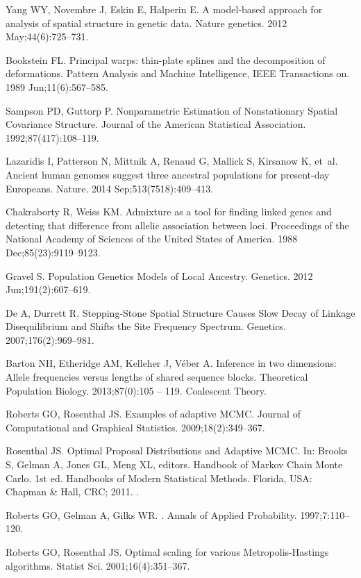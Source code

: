 \documentclass[10pt,letterpaper]{article}
\begin{document}
\begin{thebibliography}{80}
Yang WY, Novembre J, Eskin E, Halperin E.
\newblock A model-based approach for analysis of spatial structure in genetic
  data.
\newblock Nature genetics. 2012 May;44(6):725--731.

Bookstein FL.
\newblock Principal warps: thin-plate splines and the decomposition of
  deformations.
\newblock Pattern Analysis and Machine Intelligence, IEEE Transactions on. 1989
  Jun;11(6):567--585.

Sampson PD, Guttorp P.
\newblock Nonparametric Estimation of Nonstationary Spatial Covariance
  Structure.
\newblock Journal of the American Statistical Association.
  1992;87(417):108--119.

Lazaridis I, Patterson N, Mittnik A, Renaud G, Mallick S, Kirsanow K, et~al.
\newblock Ancient human genomes suggest three ancestral populations for
  present-day {Europeans}.
\newblock Nature. 2014 Sep;513(7518):409--413.

Chakraborty R, Weiss KM.
\newblock Admixture as a tool for finding linked genes and detecting that
  difference from allelic association between loci.
\newblock Proceedings of the National Academy of Sciences of the United States
  of America. 1988 Dec;85(23):9119--9123.

Gravel S.
\newblock Population Genetics Models of Local Ancestry.
\newblock Genetics. 2012 Jun;191(2):607--619.

De A, Durrett R.
\newblock Stepping-Stone Spatial Structure Causes Slow Decay of Linkage
  Disequilibrium and Shifts the Site Frequency Spectrum.
\newblock Genetics. 2007;176(2):969--981.

Barton NH, Etheridge AM, Kelleher J, Véber A.
\newblock Inference in two dimensions: Allele frequencies versus lengths of
  shared sequence blocks.
\newblock Theoretical Population Biology. 2013;87(0):105 -- 119.
\newblock Coalescent Theory.

Roberts GO, Rosenthal JS.
\newblock Examples of adaptive {MCMC}.
\newblock Journal of Computational and Graphical Statistics.
  2009;18(2):349--367.

Rosenthal JS.
\newblock Optimal Proposal Distributions and Adaptive {MCMC}.
\newblock In: Brooks S, Gelman A, Jones GL, Meng XL, editors. Handbook of
  {Markov} Chain {Monte} {Carlo}. 1st ed. Handbooks of Modern Statistical
  Methods. Florida, USA: Chapman \& Hall, CRC; 2011. .

Roberts GO, Gelman A, Gilks WR.
.
\newblock Annals of Applied Probability. 1997;7:110--120.

Roberts GO, Rosenthal JS.
\newblock Optimal scaling for various {M}etropolis-{H}astings algorithms.
\newblock Statist Sci. 2001;16(4):351--367.

\end{thebibliography}
\end{document}
